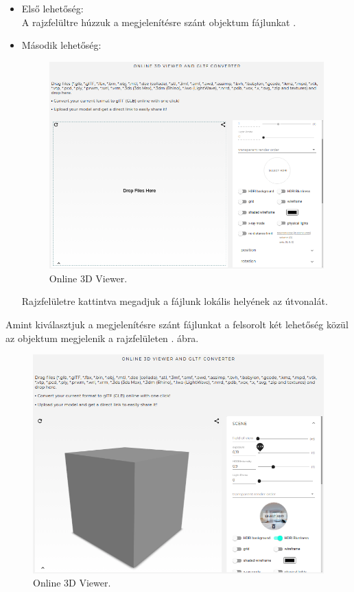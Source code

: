 \begin{itemize}
\item Első lehetőség: \\
A rajzfelültre húzzuk a megjelenítésre szánt objektum fájlunkat .
\item Második lehetőség:\\
\begin{figure}[h]
\centering
\includegraphics[width=\textwidth]{images/3D_creators.png}
\caption{Online 3D Viewer.}
\label{fig:3d1}
\end{figure}
Rajzfelületre kattintva megadjuk a fájlunk lokális helyének az útvonalát.\\
\end{itemize}
\newpage
\bigskip
Amint kiválasztjuk a megjelenítésre szánt fájlunkat a felsorolt két lehetőség közül az objektum megjelenik a rajzfelületen . ábra.
\bigskip
\begin{figure}[h]
\centering
\includegraphics[width=\textwidth]{images/3D_creators_2.png}
\caption{Online 3D Viewer.}
\label{fig:3d2}
\end{figure}
\bigskip

